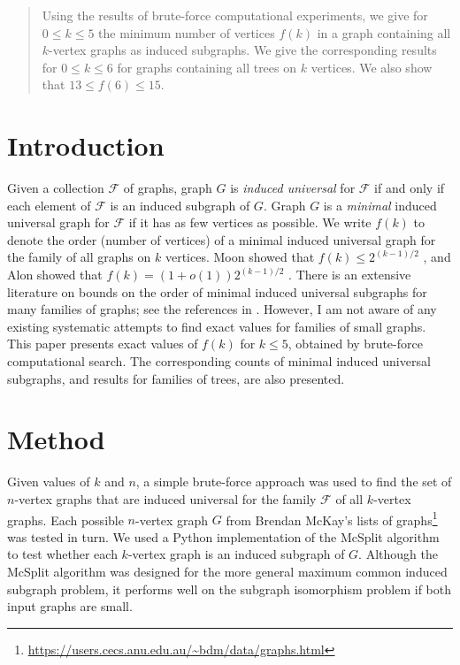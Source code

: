 \documentclass[12pt]{article}
\begin{document}
\newcommand{\calF}{\ensuremath{\mathcal{F}}}

\newtheorem{proposition}{Proposition}

\maketitle
%
\begin{abstract}
Using the results of brute-force computational experiments, we give for $0 \leq
k \leq 5$ the minimum number of vertices $f(k)$ in a graph containing all
$k$-vertex graphs as induced subgraphs.  We give the corresponding results for
$0 \leq k \leq 6$ for graphs containing all trees on $k$ vertices.  We also show
that $13 \leq f(6) \leq 15$.
\end{abstract}

\section{Introduction}

Given a collection $\calF$ of graphs, graph $G$ is \emph{induced
universal} for $\calF$ if and only if each element of $\calF$ is an induced
subgraph of $G$.  Graph $G$ is a \emph{minimal} induced universal graph
for $\calF$ if it has as few vertices as possible.  We write $f(k)$ to denote
    the order (number of vertices) of a minimal induced universal graph for the
    family of all graphs on $k$ vertices.  Moon showed that $f(k) \leq 2^{(k-1)/2}$
    \cite{moon_1965}, and Alon showed that $f(k) = (1 + o(1))2^{(k-1)/2}$
    \cite{alon2017asymptotically}.  There is an extensive literature on bounds
    on the order of minimal induced universal subgraphs for many families of
    graphs; see the references in \cite{alon2017asymptotically}.  However, I am
    not aware of any existing systematic attempts to find exact values for
    families of small graphs.  This paper presents exact values of $f(k)$ for
    $k \leq 5$, obtained by brute-force computational search.  The
    corresponding counts of minimal induced universal subgraphs, and results for
    families of trees, are also
    presented.

\section{Method}

Given values of $k$ and $n$,
a simple brute-force approach was used to find the set of
$n$-vertex graphs that are induced universal for the family $\calF$ of all $k$-vertex
graphs.  Each possible $n$-vertex graph $G$ from Brendan McKay's lists of
graphs\footnote{\url{https://users.cecs.anu.edu.au/~bdm/data/graphs.html}} was
tested in turn.  We used a Python implementation of the McSplit
algorithm \cite{DBLP:conf/ijcai/McCreeshPT17} to test whether each $k$-vertex
graph is an induced subgraph of $G$.  Although the McSplit algorithm was designed for
the more general maximum common induced subgraph problem, it performs well on
the subgraph isomorphism problem if both input graphs are small.
\end{document}
